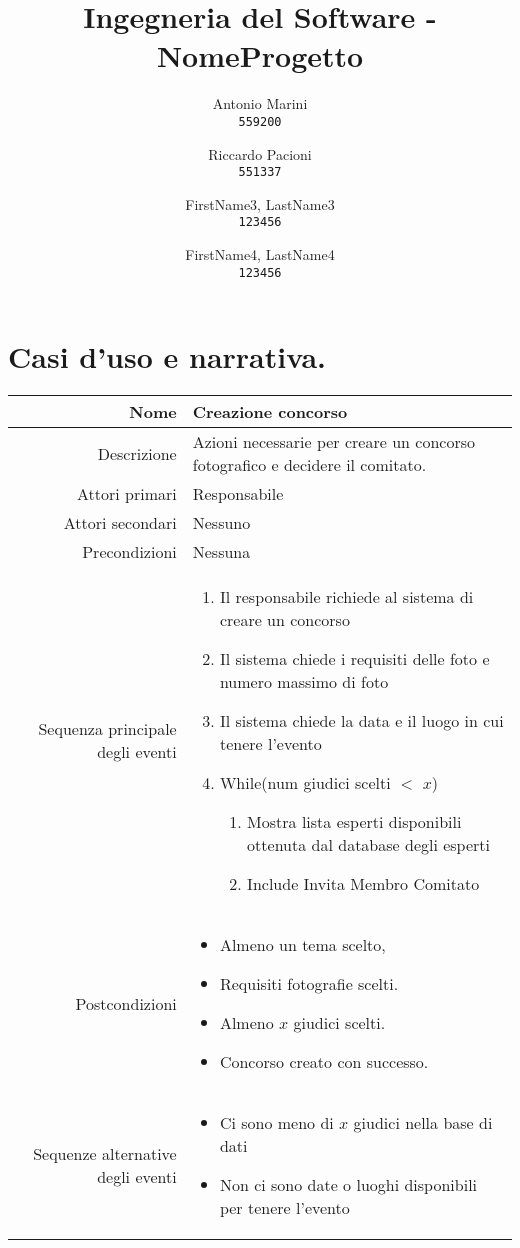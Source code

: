 \documentclass{article}
\title{Ingegneria del Software - NomeProgetto}
\author{
  Antonio Marini\\
  \texttt{559200}
  \and
  Riccardo Pacioni\\
  \texttt{551337}
  \and
  FirstName3, LastName3\\
  \texttt{123456}
  \and
  FirstName4, LastName4\\
  \texttt{123456}
}
\begin{document}
\maketitle

\newpage

\section{Casi d'uso e narrativa.}

\begin{center}
    \begin{tabular}{ |r|p{9cm}| } 
     \hline
     Nome &  Creazione concorso\\
     \hline
     Descrizione & Azioni necessarie per creare un concorso fotografico e decidere il comitato. \\
     \hline
     Attori primari &  Responsabile\\
     \hline
     Attori secondari &  Nessuno\\
     \hline
     Precondizioni &  Nessuna \\
     \hline
     Sequenza principale degli eventi & 
     \begin{enumerate}
        \item Il responsabile richiede al sistema di creare un concorso
        \item Il sistema chiede i requisiti delle foto e numero massimo di foto
        \item Il sistema chiede la data e il luogo in cui tenere l’evento
        \item While(num giudici scelti $<$ $x$)
        \begin{enumerate}
            \item Mostra lista esperti disponibili ottenuta dal database degli esperti
            \item Include Invita Membro Comitato
        \end{enumerate}
    \end{enumerate}
     \\
     \hline
     Postcondizioni &
     \begin{itemize}
        \item Almeno un tema scelto,
        \item Requisiti fotografie scelti.
        \item Almeno $x$ giudici scelti. 
        \item Concorso creato con successo.
    \end{itemize} 
     \\
     \hline
     Sequenze alternative degli eventi &
     \begin{itemize}
         \item Ci sono meno di $x$ giudici nella base di dati
         \item Non ci sono date o luoghi disponibili per tenere l’evento
     \end{itemize}
     \\
     \hline
    \end{tabular}
\end{center}
\end{document}
